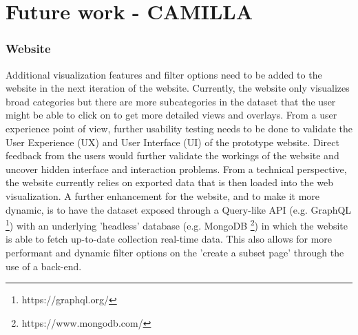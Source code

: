 \section{Future work - CAMILLA}

\subsubsection{Website}

Additional visualization features and filter options need to be added to the website in the next iteration of the website. Currently, the website only visualizes broad categories but there are more subcategories in the dataset that the user might be able to click on to get more detailed views and overlays. From a user experience point of view, further usability testing needs to be done to validate the User Experience (UX) and User Interface (UI) of the prototype website. Direct feedback from the users would further validate the workings of the website and uncover hidden interface and interaction problems. From a technical perspective, the website currently relies on exported data that is then loaded into the web visualization. A further enhancement for the website, and to make it more dynamic, is to have the dataset exposed through a Query-like API (e.g. GraphQL \footnote{https://graphql.org/}) with an underlying 'headless' database (e.g. MongoDB \footnote{https://www.mongodb.com/}) in which the website is able to fetch up-to-date collection real-time data. This also allows for more performant and dynamic filter options on the 'create a subset page' through the use of a back-end.
